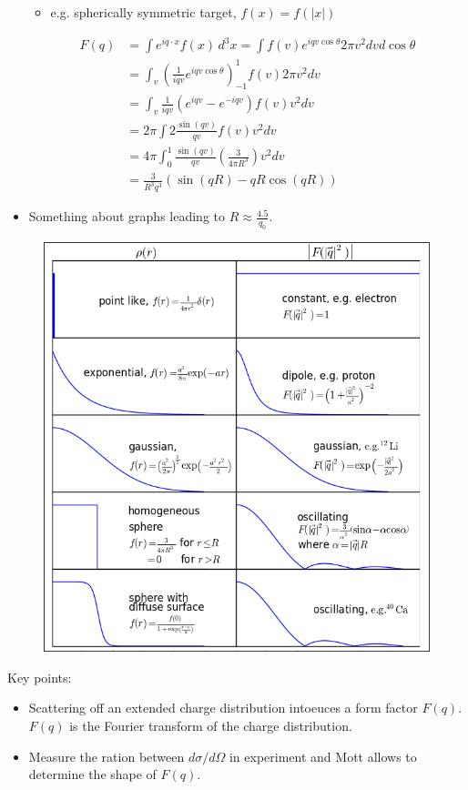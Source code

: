 \documentclass[a4paper, 11pt, normalem]{report}
\begin{document}
\begin{itemize}
\begin{itemize}
            \item e.g. spherically symmetric target, $f(x) = f(|x|)$
        \end{itemize}
        \begin{align}
            F(q) &= \int e^{iq\cdot x} f(x)\,d^3x = \int f(v) e^{iqv\cos\theta} 2\pi v^2 dv d\cos\theta \\
                 &= \int_v \left(\frac{1}{iqv} e^{iqv\cos\theta}\right)^1_{-1} f(v) 2\pi v^2 dv \\
                 &= \int_v \frac{1}{iqv} \left(e^{iqv} - e^{-iqv}\right) f(v) v^2 dv \\
                 &= 2\pi \int 2 \frac{\sin(qv)}{qv} f(v) v^2 dv \\
                 &= 4\pi \int^1_0 \frac{\sin(qv)}{qv} \left(\frac{3}{4\pi R^3}\right) v^2 dv \\
                 &= \frac{3}{R^3q^3} \left(\sin(qR) - qR\cos(qR)\right)
        \end{align}
    \item Something about graphs leading to $R \approx \frac{4.5}{q_0}$.
\end{itemize}
\begin{figure}[H]
    \centering
    \includegraphics[scale=0.5]{distro.png}
\end{figure}
Key points:
\begin{itemize}
    \item Scattering off an extended charge distribution intoeuces a form factor $F(q)$. $F(q)$ is the Fourier transform of the charge distribution. 
    \item Measure the ration between $d\sigma /d\Omega$ in experiment and Mott allows to determine the shape of $F(q)$.
\end{itemize}
\end{document}
